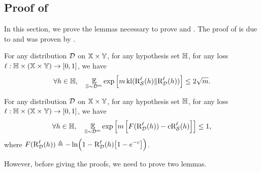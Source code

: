 \begin{noaddcontents}
\section{Proof of~}

In this section, we prove the lemmas necessary to prove  and .
The proof of  is due to \citet{Maurer2004} and  was proven by \citet{GermainLacasseLavioletteMarchand2009}.
\begin{lemma}
For any distribution $\mathcal{D}$ on $\mathbb{X}\times\mathbb{Y}$, for any hypothesis set $\mathbb{H}$, for any loss $\ell:\mathbb{H}\times(\mathbb{X}\times\mathbb{Y}) \to [0,1]$, we have 
    \begin{align*}
    \forall h\in\mathbb{H},\quad \operatorname*{\mathbb{E}}_{\mathbb{S}\sim\mathcal{D}^m}\exp\left[m\operatorname{kl}(\text{R}^{\ell}_{\mathcal{S}}(h)\|\text{R}^{\ell}_{\mathcal{D}}(h))\right] \le 2\sqrt{m}.
    \end{align*}
    \label{ap:pac-bayes:lemma:2-sqrt-m}
\end{lemma}

\begin{lemma}
    For any distribution $\mathcal{D}$ on $\mathbb{X}\times\mathbb{Y}$, for any hypothesis set $\mathbb{H}$, for any loss $\ell:\mathbb{H}\times(\mathbb{X}\times\mathbb{Y}) \to [0,1]$, we have 
    \begin{align*}
    \forall h\in\mathbb{H},\quad \operatorname*{\mathbb{E}}_{\mathbb{S}\sim\mathcal{D}^m}\exp\left[m \left[ F(\text{R}^{\ell}_{\mathcal{D}}(h))-c\text{R}^{\ell}_{\mathcal{S}}(h)\right]\right] \le 1,
    \end{align*}
    where $\displaystyle F(\text{R}^{\ell}_{\mathcal{D}}(h))\triangleq-\ln\!\left( 1-\text{R}^{\ell}_{\mathcal{D}}(h)\!\left[1-e^{-c}\right]\right)$.
    \label{ap:pac-bayes:lemma:catoni-1}
\end{lemma}

However, before giving the proofs, we need to prove two lemmas.


\end{noaddcontents}
